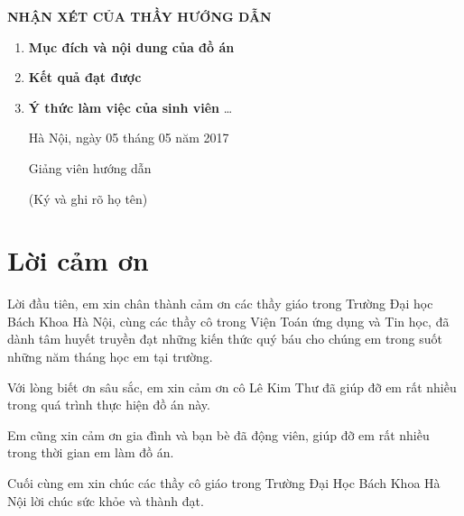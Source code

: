 \documentclass[14pt, oneside, a4paper, openany]{scrartcl}
\begin{document}
\newpage
\thispagestyle{empty}
\centerline{\Large\bf NHẬN XÉT CỦA THẦY HƯỚNG DẪN}
\begin{enumerate}
	\item \textbf{Mục đích và nội dung của đồ án}
	\newline
	\newline
	\newline
	\newline
	\item \textbf{Kết quả đạt được}
	\newline
	\newline
	\newline
	\newline
	\item \textbf{Ý thức làm việc của sinh viên} \ldots
	\newline
	\newline
	\newline
	\newline
	\newline
	
	\begin{flushright}
		Hà Nội, ngày 05 tháng 05 năm 2017
	\end{flushright}
	\hspace{95 mm}Giảng viên hướng dẫn
	
	\hspace{95 mm}(Ký và ghi rõ họ tên)
\end{enumerate}

\newpage
\thispagestyle{empty}
\tableofcontents
\newpage
\thispagestyle{empty}
\listoffigures
\listoftables
\newpage
\section{Lời cảm ơn}
Lời đầu tiên, em xin chân thành cảm ơn các thầy giáo trong Trường Đại học Bách Khoa Hà Nội, cùng các thầy cô trong Viện Toán ứng dụng và Tin học, đã dành tâm huyết truyền đạt những kiến thức quý báu cho chúng em trong suốt những năm tháng học em tại trường.

Với lòng biết ơn sâu sắc, em xin cảm ơn cô Lê Kim Thư đã giúp đỡ em rất nhiều trong quá trình thực hiện đồ án này.

Em cũng xin cảm ơn gia đình và bạn bè đã động viên, giúp đỡ em rất nhiều trong thời gian em làm đồ án.

Cuối cùng em xin chúc các thầy cô giáo trong Trường Đại Học Bách Khoa Hà Nội lời chúc sức khỏe và thành đạt.
\end{document}
